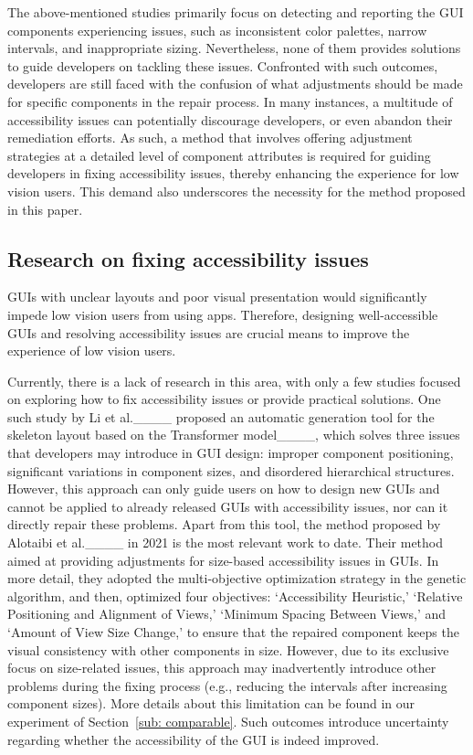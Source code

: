 The above-mentioned studies primarily focus on detecting and reporting the GUI components experiencing issues, such as inconsistent color palettes, narrow intervals, and inappropriate sizing.
Nevertheless, none of them provides solutions to guide developers on tackling these issues.
Confronted with such outcomes, developers are still faced with the confusion of what adjustments should be made for specific components in the repair process.
In many instances, a multitude of accessibility issues can potentially discourage developers, or even abandon their remediation efforts.
As such, a method that involves offering adjustment strategies at a detailed level of component attributes is required for guiding developers in fixing accessibility issues, thereby enhancing the experience for low vision users.
This demand also underscores the necessity for the method proposed in this paper.

\subsection{Research on fixing accessibility issues}\label{sub: research2}
GUIs with unclear layouts and poor visual presentation would significantly impede low vision users from using apps.
Therefore, designing well-accessible GUIs and resolving accessibility issues are crucial means to improve the experience of low vision users.

Currently, there is a lack of research in this area, with only a few studies focused on exploring how to fix accessibility issues or provide practical solutions.
One such study by Li et al.____ proposed an automatic generation tool for the skeleton layout based on the Transformer model____, which solves three issues that developers may introduce in GUI design: improper component positioning, significant variations in component sizes, and disordered hierarchical structures. 
However, this approach can only guide users on how to design new GUIs and cannot be applied to already released GUIs with accessibility issues, nor can it directly repair these problems.
Apart from this tool, the method proposed by Alotaibi et al.____ in 2021 is the most relevant work to date.
Their method aimed at providing adjustments for size-based accessibility issues in GUIs. 
In more detail, they adopted the multi-objective optimization strategy in the genetic algorithm, and then, optimized four objectives: `Accessibility Heuristic,' `Relative Positioning and Alignment of Views,' `Minimum Spacing Between Views,' and `Amount of View Size Change,' to ensure that the repaired component keeps the visual consistency with other components in size. 
However, due to its exclusive focus on size-related issues, this approach may inadvertently introduce other problems during the fixing process (e.g., reducing the intervals after increasing component sizes). 
More details about this limitation can be found in our experiment of Section~\ref{sub: comparable}.
Such outcomes introduce uncertainty regarding whether the accessibility of the GUI is indeed improved.

